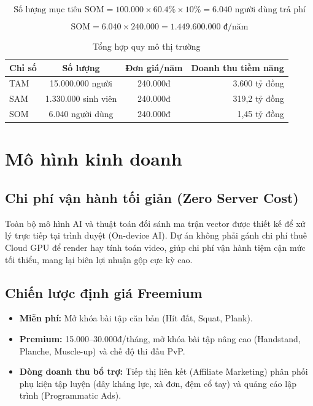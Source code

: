 \documentclass[a4paper,12pt]{article}
\begin{document}
\begin{equation}
    \text{Số lượng mục tiêu SOM} = 100.000 \times 60.4\% \times 10\% = 6.040 \text{ người dùng trả phí}
\end{equation}

\begin{equation}
    \text{SOM} = 6.040 \times 240.000 = 1.449.600.000 \text{ đ/năm}
\end{equation}

\begin{table}[H]
    \centering
    \caption{Tổng hợp quy mô thị trường}
    \label{tab:tam-sam-som}
    \begin{tabular}{lccr}
        \toprule
        \textbf{Chỉ số} & \textbf{Số lượng} & \textbf{Đơn giá/năm} & \textbf{Doanh thu tiềm năng} \\
        \midrule
        TAM & 15.000.000 người & 240.000đ & 3.600 tỷ đồng \\
        SAM & 1.330.000 sinh viên & 240.000đ & 319,2 tỷ đồng \\
        SOM & 6.040 người dùng & 240.000đ & 1,45 tỷ đồng \\
        \bottomrule
    \end{tabular}
\end{table}

\section{Mô hình kinh doanh}

\subsection{Chi phí vận hành tối giản (Zero Server Cost)}
Toàn bộ mô hình AI và thuật toán đối sánh ma trận vector được thiết kế để xử lý trực tiếp tại trình duyệt (On-device AI). Dự án không phải gánh chi phí thuê Cloud GPU để render hay tính toán video, giúp chi phí vận hành tiệm cận mức tối thiểu, mang lại biên lợi nhuận gộp cực kỳ cao.

\subsection{Chiến lược định giá Freemium}
\begin{itemize}
    \item \textbf{Miễn phí:} Mở khóa bài tập căn bản (Hít đất, Squat, Plank).
    \item \textbf{Premium:} 15.000--30.000đ/tháng, mở khóa bài tập nâng cao (Handstand, Planche, Muscle-up) và chế độ thi đấu PvP.
    \item \textbf{Dòng doanh thu bổ trợ:} Tiếp thị liên kết (Affiliate Marketing) phân phối phụ kiện tập luyện (dây kháng lực, xà đơn, đệm cổ tay) và quảng cáo lập trình (Programmatic Ads).
\end{itemize}
\end{document}

